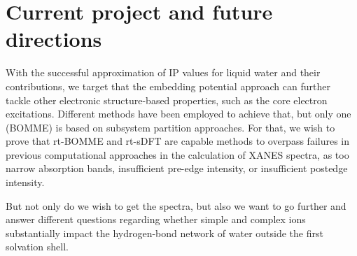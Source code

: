 \documentclass[notitlepage,12pt]{report}
\begin{document}
\section{Current project and future directions}

With the successful approximation of IP values for liquid water and their contributions, we target that the embedding potential approach can further tackle other electronic structure-based properties, such as the core electron excitations. Different methods have been employed to achieve that, but only one (BOMME) is based on subsystem partition approaches. For that, we wish to prove that rt-BOMME and rt-sDFT are capable methods to overpass failures in previous computational approaches in the calculation of XANES spectra, as too narrow absorption bands, insufficient pre-edge intensity, or insufficient postedge intensity.

But not only do we wish to get the spectra, but also we want to go further and answer different questions regarding whether simple and complex ions substantially impact the hydrogen-bond network of water outside the first solvation shell. 

\printbibliography
\end{document}
